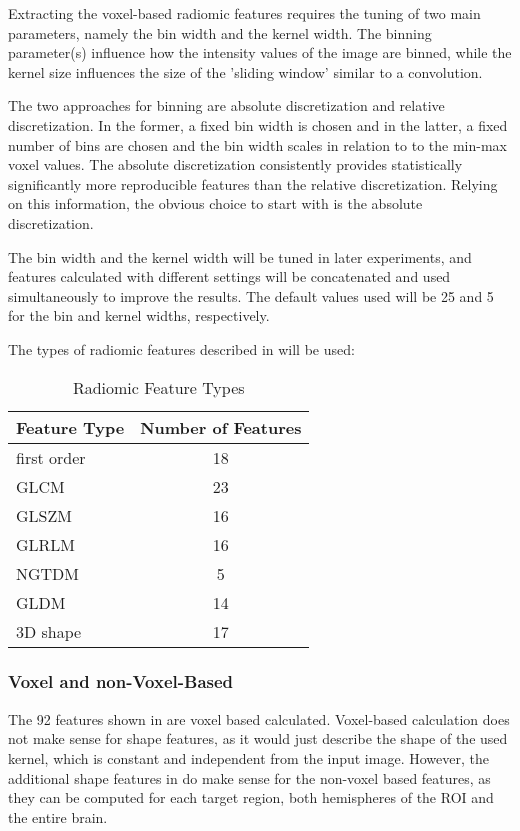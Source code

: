 Extracting the voxel-based radiomic features requires the tuning of two main parameters, namely the bin width and the kernel width. The binning parameter(s) influence how the intensity values of the image are binned, while the kernel size influences the size of the 'sliding window' similar to a convolution.\par
The two approaches for binning are absolute discretization and relative discretization. In the former, a fixed bin width is chosen and in the latter, a fixed number of bins are chosen and the bin width scales in relation to to the min-max voxel values. The absolute discretization consistently provides statistically significantly more reproducible features than the relative discretization. \cite{bin} Relying on this information, the obvious choice to start with is the absolute discretization.\par
The bin width and the kernel width will be tuned in later experiments, and features calculated with different settings will be concatenated and used simultaneously to improve the results. The default values used will be 25 and 5 for the bin and kernel widths, respectively.\par
The types of radiomic features described in  will be used:
\begin{table}[H]
\centering
\begin{tabular}{|l|c|}
\hline
\textbf{Feature Type} & \textbf{Number of Features} \\ \hline
first order & 18 \\ \hline
\ac{GLCM} & 23 \\ \hline
\ac{GLSZM} & 16 \\ \hline
\ac{GLRLM} & 16 \\ \hline
\ac{NGTDM} & 5 \\ \hline
\ac{GLDM} & 14 \\ \hline
3D shape & 17 \\ \hline
\end{tabular}
\caption{Radiomic Feature Types}
\label{tab:radf0}
\end{table}

\subsubsection{Voxel and non-Voxel-Based}
The 92 features shown in  are voxel based calculated. Voxel-based calculation does not make sense for shape features, as it would just describe the shape of the used kernel, which is constant and independent from the input image. However, the additional shape features in  do make sense for the non-voxel based features, as they can be computed for each target region, both hemispheres of the ROI and the entire brain.

